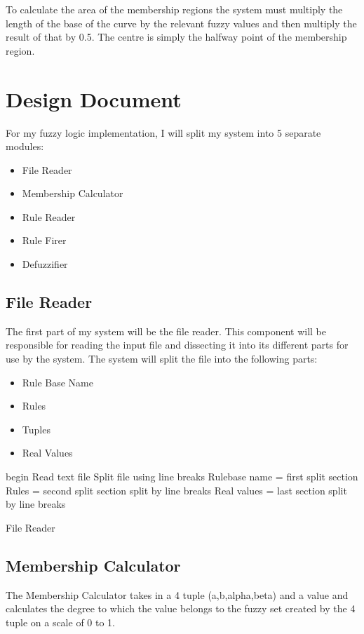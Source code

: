 \documentclass{article}
\begin{document}
To calculate the area of the membership regions the system must multiply the length of the base of the curve by the relevant fuzzy values and then multiply the result of that by 0.5. The centre is simply the halfway point of the membership region.

\section{Design Document} 
For my fuzzy logic implementation, I will split my system into 5 separate modules:
\begin{itemize}
  \item File Reader
  \item Membership Calculator
  \item Rule Reader
  \item Rule Firer
  \item Defuzzifier
\end{itemize}

\subsection{File Reader}
The first part of my system will be the file reader. This component will be responsible for reading the input file and dissecting it into its different parts for use by the system. The system will split the file into the following parts:

\begin{itemize}
  \item Rule Base Name
  \item Rules
  \item Tuples
  \item Real Values
\end{itemize}

\begin{algorithm}[H]
\SetAlgoLined
{}
 begin\;
Read text file\;
Split file using line breaks\;
Rulebase name = first split section\;
Rules = second split section split by line breaks\;
Real values = last section split by line breaks\;
 \caption{File Reader}
\end{algorithm}

\subsection{Membership Calculator}
The Membership Calculator takes in a 4 tuple (a,b,alpha,beta) and a value and calculates the degree to which the value belongs to the fuzzy set created by the 4 tuple on a scale of 0 to 1. 
\end{document}
